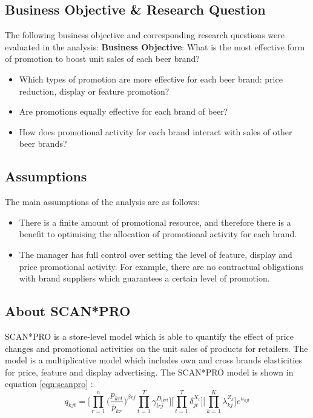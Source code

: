 \documentclass[a4paper,11pt]{article}
\begin{document}
\subsection{Business Objective \& Research Question}
The following business objective and corresponding research questions were evaluated in the analysis:
\newline
\newline
\textbf{Business Objective}: What is the most effective form of promotion to boost unit sales of each beer brand?
\begin{itemize}
        \item Which types of promotion are more effective for each beer brand: price reduction, display or feature promotion?
        \item Are promotions equally effective for each brand of beer?
        \item How does promotional activity for each brand interact with sales of other beer brands?
\end{itemize}
\newline
\newline

\subsection{Assumptions}

The main assumptions of the analysis are as follows:
\begin{itemize}
    \item There is a finite amount of promotional resource, and therefore there is a benefit to optimising the allocation of promotional activity for each brand.
    \item The manager has full control over setting the level of feature, display and price promotional activity. For example, there are no contractual obligations with brand suppliers which guarantees a certain level of promotion.
\end{itemize}


\subsection{About SCAN*PRO}

SCAN*PRO is a store-level model which is able to quantify the effect of price changes and promotional activities on the unit sales of products for retailers. The model is a multiplicative model which includes own and cross brands elasticities for price, feature and display advertising. The SCAN*PRO model is shown in equation \ref{eqn:scanpro}  \citep{leeflang_how_2002}:
\begin{equation}
\label{eqn:scanpro}
    q_{kjt} = \Bigg[\prod_{r=1}^n\Bigg(\frac{p_{krt}}{\bar{p}_{kr}}\Bigg)^{\beta rj}\prod_{t=1}^{T}\gamma_{lrj}^{D_{lkrt}}\Bigg]\Bigg[\prod_{t=1}^{T}\delta_{jt}^{X_{t}}\Bigg]\Bigg[\prod_{k=1}^{K}\lambda_{kj}^{Z_{k}}\Bigg]e^{u_{kjt}} 
\end{equation}
\end{document}
